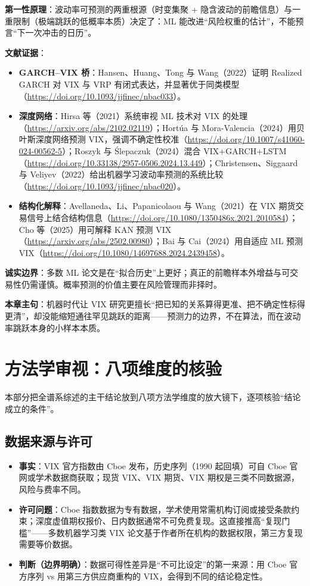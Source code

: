 \documentclass[11pt,a4paper]{article}
\begin{document}
\textbf{第一性原理}：波动率可预测的两重根源（时变集聚 + 隐含波动的前瞻信息）与一重限制（极端跳跃的低概率本质）决定了：ML 能改进“风险权重的估计”，不能预言“下一次冲击的日历”。

\textbf{文献证据}：
\begin{itemize}[leftmargin=2.2em]
  \item \textbf{GARCH--VIX 桥}：Hansen、Huang、Tong 与 Wang（2022）证明 Realized GARCH 对 VIX 与 VRP 有闭式表达，并显著优于同类模型（\url{https://doi.org/10.1093/jjfinec/nbac033}）。
  \item \textbf{深度网络}：Hirsa 等（2021）系统审视 ML 技术对 VIX 的处理（\url{https://arxiv.org/abs/2102.02119}）；Hortúa 与 Mora-Valencia（2024）用贝叶斯深度网络预测 VIX，强调不确定性校准（\url{https://doi.org/10.1007/s41060-024-00562-5}）；Roszyk 与 Ślepaczuk（2024）混合 VIX+GARCH+LSTM（\url{https://doi.org/10.33138/2957-0506.2024.13.449}）；Christensen、Siggaard 与 Veliyev（2022）给出机器学习波动率预测的系统比较（\url{https://doi.org/10.1093/jjfinec/nbac020}）。
  \item \textbf{结构化解释}：Avellaneda、Li、Papanicolaou 与 Wang（2021）在 VIX 期货交易信号上结合结构信息（\url{https://doi.org/10.1080/1350486x.2021.2010584}）；Cho 等（2025）用可解释 KAN 预测 VIX（\url{https://arxiv.org/abs/2502.00980}）；Bai 与 Cai（2024）用自适应 ML 预测 VIX（\url{https://doi.org/10.1080/14697688.2024.2439458}）。
\end{itemize}

\textbf{诚实边界}：多数 ML 论文是在“拟合历史”上更好；真正的前瞻样本外增益与可交易性仍需谨慎。概率预测的价值主要在风险管理而非择时。

\textbf{本章主句}：机器时代让 VIX 研究更擅长“把已知的关系算得更准、把不确定性标得更清”，却没能缩短通往罕见跳跃的距离——预测力的边界，不在算法，而在波动率跳跃本身的小样本本质。

\newpage
\section{方法学审视：八项维度的核验}

本部分把全谱系综述的主干结论放到八项方法学维度的放大镜下，逐项核验“结论成立的条件”。

\subsection{数据来源与许可}

\begin{itemize}[leftmargin=2.2em]
  \item \textbf{事实}：VIX 官方指数由 Cboe 发布，历史序列（1990 起回填）可自 Cboe 官网或学术数据商获取；现货 VIX、VIX 期货、VIX 期权是三类不同数据源，风险与费率不同。
  \item \textbf{许可问题}：Cboe 指数数据为专有数据，学术使用常需机构订阅或接受条款约束；深度虚值期权报价、日内数据通常不可免费复现。这直接推高“复现门槛”——多数机器学习类 VIX 论文基于作者所在机构的数据权限，第三方复现需要等价数据。
  \item \textbf{判断（边界明确）}：数据可得性差异是“不可比设定”的第一来源：用 Cboe 官方序列 vs 用第三方供应商重构的 VIX，会得到不同的结论稳定性。
\end{itemize}
\end{document}
